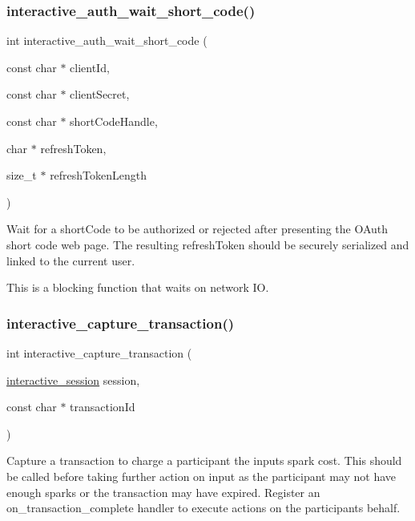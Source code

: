 \subsubsection{\texorpdfstring{interactive\+\_\+auth\+\_\+wait\+\_\+short\+\_\+code()}{interactive\_auth\_wait\_short\_code()}}
{\footnotesize\ttfamily int interactive\+\_\+auth\+\_\+wait\+\_\+short\+\_\+code (\begin{DoxyParamCaption}\item[{const char $\ast$}]{client\+Id,  }\item[{const char $\ast$}]{client\+Secret,  }\item[{const char $\ast$}]{short\+Code\+Handle,  }\item[{char $\ast$}]{refresh\+Token,  }\item[{size\+\_\+t $\ast$}]{refresh\+Token\+Length }\end{DoxyParamCaption})}



Wait for a {\ttfamily short\+Code} to be authorized or rejected after presenting the O\+Auth short code web page. The resulting {\ttfamily refresh\+Token} should be securely serialized and linked to the current user. 

This is a blocking function that waits on network IO. \mbox{\label{group___interactivity_gaf0e27843b3cc1450eac03938ca25453f}} 
\subsubsection{\texorpdfstring{interactive\+\_\+capture\+\_\+transaction()}{interactive\_capture\_transaction()}}
{\footnotesize\ttfamily int interactive\+\_\+capture\+\_\+transaction (\begin{DoxyParamCaption}\item[{\mbox{\hyperlink{group___interactivity_ga6d8819d38b8dc8994a2299cf22a65a31}{interactive\+\_\+session}}}]{session,  }\item[{const char $\ast$}]{transaction\+Id }\end{DoxyParamCaption})}



Capture a transaction to charge a participant the input\textquotesingle{}s spark cost. This should be called before taking further action on input as the participant may not have enough sparks or the transaction may have expired. Register an {\ttfamily on\+\_\+transaction\+\_\+complete} handler to execute actions on the participant\textquotesingle{}s behalf. 

